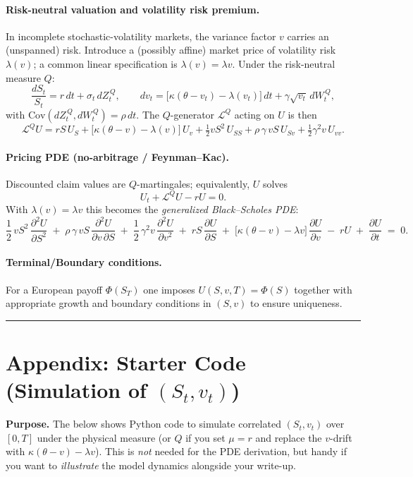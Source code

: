 \documentclass[11pt]{article}
\begin{document}
\paragraph{Risk-neutral valuation and volatility risk premium.}
In incomplete stochastic-volatility markets, the variance factor $v$ carries an
(unspanned) risk. Introduce a (possibly affine) market price of volatility risk
$\lambda(v)$; a common linear specification is $\lambda(v)=\lambda v$.
Under the risk-neutral measure $Q$:
\[
\frac{dS_t}{S_t} = r\,dt + \sigma_t\,dZ_t^{\,Q},\qquad
dv_t = \big[\kappa(\theta - v_t) - \lambda(v_t)\big]\,dt + \gamma \sqrt{v_t}\,dW_t^{\,Q},
\]
with $\mathrm{Cov}(dZ_t^{\,Q},dW_t^{\,Q})=\rho\,dt$. The $Q$-generator $\mathcal L^Q$ acting on $U$ is then
\[
\mathcal L^Q U
= r S\,U_S
+ \big[\kappa(\theta - v) - \lambda(v)\big]\,U_v
+ \tfrac12 v S^2\,U_{SS}
+ \rho\,\gamma\,v S\,U_{Sv}
+ \tfrac12 \gamma^2 v\,U_{vv}.
\]

\paragraph{Pricing PDE (no-arbitrage / Feynman--Kac).}
Discounted claim values are $Q$-martingales; equivalently, $U$ solves
\[
U_t + \mathcal L^Q U - r U = 0.
\]
With $\lambda(v)=\lambda v$ this becomes the \emph{generalized Black--Scholes PDE}:
\[
\boxed{
\frac{1}{2}\,v S^{2}\,\frac{\partial^{2}U}{\partial S^{2}}
\;+\;
\rho\,\gamma\,v S\,\frac{\partial^{2}U}{\partial v\,\partial S}
\;+\;
\frac{1}{2}\,\gamma^{2} v\,\frac{\partial^{2}U}{\partial v^{2}}
\;+\;
r S\,\frac{\partial U}{\partial S}
\;+\;
\big[\kappa(\theta - v) - \lambda v\big]\,\frac{\partial U}{\partial v}
\;-\; r U
\;+\;
\frac{\partial U}{\partial t}
\;=\; 0.
}
\]

\paragraph{Terminal/Boundary conditions.}
For a European payoff $\Phi(S_T)$ one imposes
$U(S,v,T)=\Phi(S)$ together with appropriate growth and boundary conditions in $(S,v)$
to ensure uniqueness.

\bigskip
\hrule
\bigskip

\appendix
\section*{Appendix: Starter Code (Simulation of $(S_t,v_t)$)}

\noindent
\textbf{Purpose.} The below shows Python code to simulate correlated $(S_t,v_t)$ over $[0,T]$ under the physical measure (or $Q$ if you set $\mu=r$ and replace the $v$-drift with $\kappa(\theta-v)-\lambda v$). This is \emph{not} needed for the PDE derivation, but handy if you want to \emph{illustrate} the model dynamics alongside your write-up.
\end{document}
